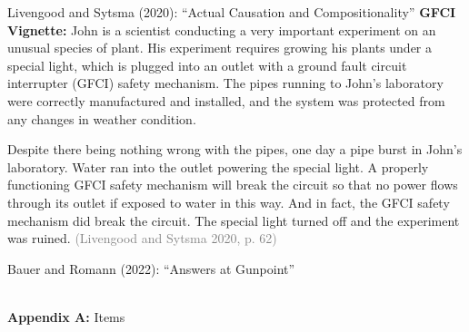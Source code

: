 \documentclass[xcolor=table,9pt,aspectratio=169]{beamer}
\begin{document}
\begin{frame}{\vspace*{10mm}Livengood and Sytsma (2020): ``Actual Causation and Compositionality''}
\vspace*{-5mm}
\textbf{GFCI Vignette:} John is a scientist conducting a very important experiment on an unusual species of plant. His experiment requires growing his plants under a special light, which is plugged into an outlet with a ground fault circuit interrupter (GFCI) safety mechanism. The pipes running to John's laboratory were correctly manufactured and installed, and the system was protected from any changes in weather condition.\par
\hspace{2em}Despite there being nothing wrong with the pipes, one day a pipe burst in John's laboratory. Water ran into the outlet powering the special light. A properly functioning GFCI safety mechanism will break the circuit so that no power flows through its outlet if exposed to water in this way. And in fact, the GFCI safety mechanism did break the circuit. The special light turned off and the experiment was ruined. \textcolor{gray}{(Livengood and Sytsma 2020, p. 62)}
\end{frame}


\begin{frame}{\vspace*{10mm}Bauer and Romann (2022): ``Answers at Gunpoint''}
\vspace*{-5mm}
\begin{center}
   \\
   {\footnotesize\textbf{Appendix A:} Items}\\
\end{center}
\end{frame}
\end{document}
